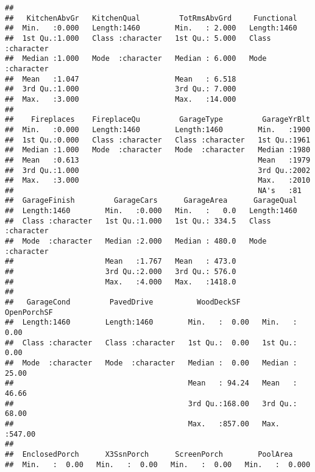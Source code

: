\documentclass[]{article}
\begin{document}
\begin{verbatim}
##                                                                    
##   KitchenAbvGr   KitchenQual         TotRmsAbvGrd     Functional       
##  Min.   :0.000   Length:1460        Min.   : 2.000   Length:1460       
##  1st Qu.:1.000   Class :character   1st Qu.: 5.000   Class :character  
##  Median :1.000   Mode  :character   Median : 6.000   Mode  :character  
##  Mean   :1.047                      Mean   : 6.518                     
##  3rd Qu.:1.000                      3rd Qu.: 7.000                     
##  Max.   :3.000                      Max.   :14.000                     
##                                                                        
##    Fireplaces    FireplaceQu         GarageType         GarageYrBlt  
##  Min.   :0.000   Length:1460        Length:1460        Min.   :1900  
##  1st Qu.:0.000   Class :character   Class :character   1st Qu.:1961  
##  Median :1.000   Mode  :character   Mode  :character   Median :1980  
##  Mean   :0.613                                         Mean   :1979  
##  3rd Qu.:1.000                                         3rd Qu.:2002  
##  Max.   :3.000                                         Max.   :2010  
##                                                        NA's   :81    
##  GarageFinish         GarageCars      GarageArea      GarageQual       
##  Length:1460        Min.   :0.000   Min.   :   0.0   Length:1460       
##  Class :character   1st Qu.:1.000   1st Qu.: 334.5   Class :character  
##  Mode  :character   Median :2.000   Median : 480.0   Mode  :character  
##                     Mean   :1.767   Mean   : 473.0                     
##                     3rd Qu.:2.000   3rd Qu.: 576.0                     
##                     Max.   :4.000   Max.   :1418.0                     
##                                                                        
##   GarageCond         PavedDrive          WoodDeckSF      OpenPorchSF    
##  Length:1460        Length:1460        Min.   :  0.00   Min.   :  0.00  
##  Class :character   Class :character   1st Qu.:  0.00   1st Qu.:  0.00  
##  Mode  :character   Mode  :character   Median :  0.00   Median : 25.00  
##                                        Mean   : 94.24   Mean   : 46.66  
##                                        3rd Qu.:168.00   3rd Qu.: 68.00  
##                                        Max.   :857.00   Max.   :547.00  
##                                                                         
##  EnclosedPorch      X3SsnPorch      ScreenPorch        PoolArea      
##  Min.   :  0.00   Min.   :  0.00   Min.   :  0.00   Min.   :  0.000  

\end{verbatim}
\end{document}
